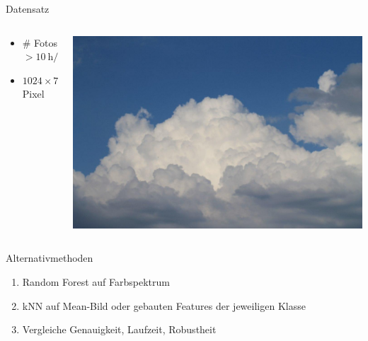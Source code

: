 \begin{frame}{Datensatz}
  \begin{columns}
    \begin{column}{0.5\textwidth}
      \begin{itemize}
        \item \# Fotos $> \SI{10}{\hour\per\day} \cdot \SI{4}{\per\hour} \cdot \si{\day}$
        \item $1024 \times 768$ Pixel
      \end{itemize}
    \end{column}
    \begin{column}{0.5\textwidth}
      \centering
      \includegraphics[width=\textwidth]{content/wolke01.jpg}
    \end{column}
  \end{columns}
\end{frame}

\begin{frame}{Alternativmethoden}
  \begin{enumerate}
    \item Random Forest auf Farbspektrum
    \item kNN auf Mean-Bild oder gebauten Features der jeweiligen Klasse
    \item[\Rightarrow] Vergleiche Genauigkeit, Laufzeit, Robustheit
  \end{enumerate}
\end{frame}
